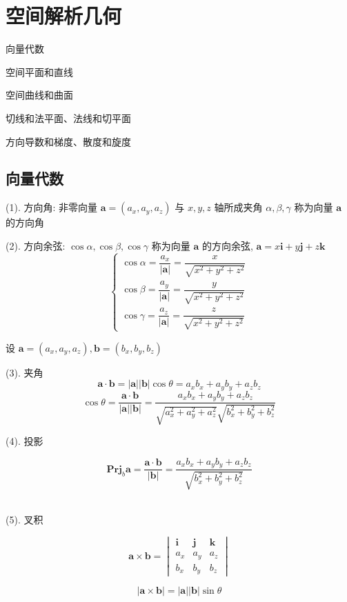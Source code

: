 \chapter{空间解析几何}
\begin{introduction}
	\item 向量代数
	\item 空间平面和直线
	\item 空间曲线和曲面
	\item 切线和法平面、法线和切平面
	\item 方向导数和梯度、散度和旋度
\end{introduction}
\section{向量代数}
\begin{definition}[向量代数]
	(1). 方向角: 非零向量 $\boldsymbol{a} = (a_{x},a_{y},a_{z})$ 与 $x,y,z$ 轴所成夹角 $\alpha,\beta,\gamma$ 称为向量 $\boldsymbol{a}$ 的方向角 
	
	(2). 方向余弦: $\cos \alpha,\cos \beta,\cos\gamma$ 称为向量 $\boldsymbol{a}$ 的方向余弦, $\boldsymbol{a} = x\boldsymbol{i} + y\boldsymbol{j} + z\boldsymbol{k}$
	$$\begin{cases}
		\cos \alpha=\dfrac{a_{x}}{|\boldsymbol{a}|} = \dfrac{x}{\sqrt{x^{2}+y^{2}+z^{2}}}\\
		\cos \beta=\dfrac{a_{y}}{|\boldsymbol{a}|} = \dfrac{y}{\sqrt{x^{2}+y^{2}+z^{2}}}\\
		\cos \gamma=\dfrac{a_{z}}{|\boldsymbol{a}|} = \dfrac{z}{\sqrt{x^{2}+y^{2}+z^{2}}}
	\end{cases}$$

	设 $\boldsymbol{a} = (a_{x},a_{y},a_{z}), \boldsymbol{b} = (b_{x},b_{y},b_{z})$

	(3). 夹角
	$$\boldsymbol{a}\cdot \boldsymbol{b} = |\boldsymbol{a}||\boldsymbol{b}|\cos \theta = a_{x}b_{x}+a_{y}b_{y}+a_{z}b_{z}$$
	$$\cos \theta = \dfrac{\boldsymbol{a}\cdot \boldsymbol{b}}{|\boldsymbol{a}||\boldsymbol{b}|} = \dfrac{a_{x}b_{x}+a_{y}b_{y}+a_{z}b_{z}}{\sqrt{a_{x}^2+a_{y}^2+a_{z}^2}\sqrt{b_{x}^2+b_{y}^2+b_{z}^2}}$$
	
	(4). 投影

	$$\textbf{Prj}_{b}\boldsymbol{a}=\dfrac{\boldsymbol{a}\cdot \boldsymbol{b}}{|\boldsymbol{b}|}=\dfrac{a_{x}b_{x}+a_{y}b_{y}+a_{z}b_{z}}{\sqrt{b_{x}^2+b_{y}^2+b_{z}^2}}$$\

	(5). 叉积

	$$\boldsymbol{a}\times \boldsymbol{b} = \begin{vmatrix}
		\boldsymbol{i} & \boldsymbol{j} & \boldsymbol{k} \\
		a_{x} & a_{y} & a_{z} \\
		b_{x} & b_{y} & b_{z}
	\end{vmatrix}$$
	
	$$|\boldsymbol{a}\times \boldsymbol{b}| = |\boldsymbol{a}||\boldsymbol{b}|\sin\theta$$
\end{definition}

